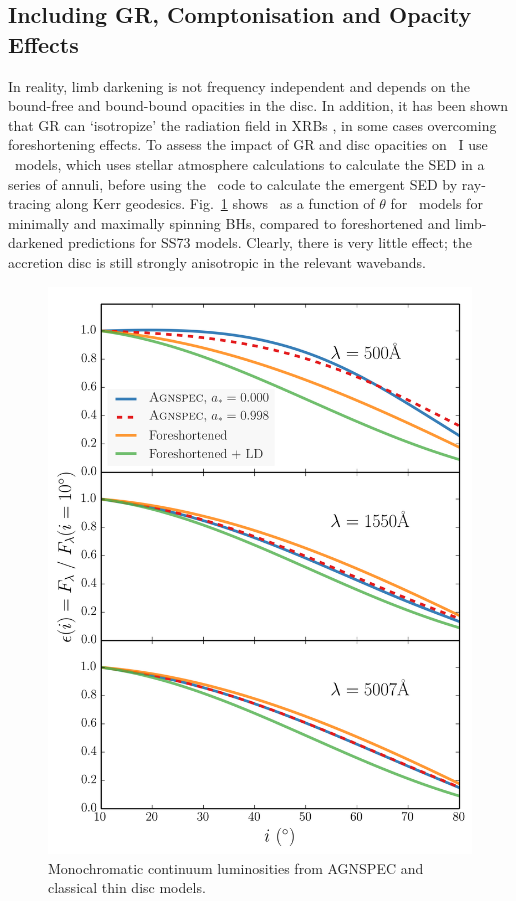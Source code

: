 \subsection{Including GR, Comptonisation and Opacity Effects}

\noindent
In reality, limb darkening is not frequency independent and 
depends on the bound-free and bound-bound opacities in the disc.
In addition, it has been shown that GR can `isotropize' the radiation
field in XRBs \citep{zhang1997,munozdarias2013}, in some cases overcoming
foreshortening effects. To assess the impact of GR and disc opacities
on \ept\ I use \agn\ models, which uses stellar atmosphere 
calculations to calculate the 
SED in a series of annuli, before using the \kerrtrans\ code 
to calculate the emergent SED by ray-tracing along Kerr geodesics.
Fig.~\ref{fig:agnspec_disc} shows \ept\ as a function of 
$\theta$ for \agn\ models for minimally and maximally spinning BHs,
compared to foreshortened and limb-darkened predictions for SS73 models.
Clearly, there is very little effect; 
the accretion disc is still strongly anisotropic in the relevant wavebands.

\begin{figure}
\centering
\includegraphics[width=1.0\textwidth]{figures/ewpaper/agnspec.png}
\caption
{
Monochromatic continuum luminosities from AGNSPEC and classical thin disc
models.
}
\label{fig:agnspec_disc}
\end{figure} 

